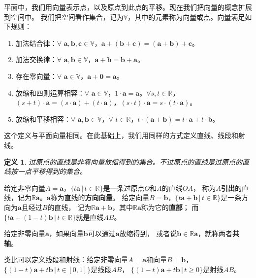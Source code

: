 \documentclass[12pt,UTF8]{ctexbook}
\newtheorem{df}{定义}[section]
\begin{document}
平面中，我们用向量表示点，以及原点到此点的平移。现在我们把向量的概念扩展到空间中。
我们把空间看作集合，记为$\mathbb{V}$，其中的元素称为向量或点。向量满足如下规则：

\begin{enumerate}
    \item 加法结合律：$\forall \,\, \mathbf{a}, \mathbf{b}, \mathbf{c} \in \mathbb{V}$，$\mathbf{a}+ (\mathbf{b} + \mathbf{c}) = (\mathbf{a} + \mathbf{b}) + \mathbf{c}$。
    \item 加法交换律：$\forall \,\, \mathbf{a}, \mathbf{b} \in \mathbb{V}$，$\mathbf{a} + \mathbf{b} = \mathbf{b} + \mathbf{a}$。
    \item 存在零向量：$\forall \,\, \mathbf{a} \in \mathbb{V}$，$\mathbf{a} + \mathbf{0} = \mathbf{a}$。
    \item 放缩和四则运算相容：$\forall \,\, \mathbf{a} \in \mathbb{V}$，$1\cdot \mathbf{a} = \mathbf{a}$。$\forall s, t \in \mathbb{R}$，$(s + t)\cdot\mathbf{a} = (s\cdot\mathbf{a}) + (t\cdot\mathbf{a})$，$(s \cdot t)\cdot \mathbf{a} = s \cdot (t\cdot \mathbf{a})$。
    \item 放缩和平移相容：$\forall \,\, \mathbf{a}, \mathbf{b} \in \mathbb{V}$，$\forall \,\, t \in \mathbb{R}$，$t\cdot(\mathbf{a} + \mathbf{b}) = t\cdot\mathbf{a} + t\cdot\mathbf{b}$。
\end{enumerate}

这个定义与平面向量相同。在此基础上，我们用同样的方式定义直线、线段和射线。
\begin{df}
    过原点的直线是非零向量放缩得到的集合。不过原点的直线是过原点的直线按一点平移得到的集合。
\end{df}
给定非零向量$A = \mathbf{a}$，$ \{t\mathbf{a} \, | \, t\in\mathbb{R}\}$是一条过原点$O$和$A$的直线$OA$，
称为$A$\textbf{引出}的直线，记为$\mathbb{R}\mathbf{a}$。$\mathbf{a}$称为直线的\textbf{方向向量}。
给定向量$B = \mathbf{b}$，$ \{t\mathbf{a}+\mathbf{b} \, | \, t\in\mathbb{R}\}$是一条方向为$\mathbf{a}$且经过$B$的直线，
记为$\mathbb{R}\mathbf{a}+\mathbf{b}$，其中$\mathbb{R}\mathbf{a}$称为它的\textbf{直部}；
而$ \{t\mathbf{a}+(1 - t)\mathbf{b} \, | \, t\in\mathbb{R}\}$就是直线$AB$。

给定非零向量$\mathbf{a}$，如果向量$\mathbf{b}$可以通过$\mathbf{a}$放缩得到，
或者说$\mathbf{b}\in \mathbb{R}\mathbf{a}$，就称两者\textbf{共轴}。

类比可以定义线段和射线：给定非零向量$A = \mathbf{a}$和向量$B =\mathbf{b}$，
$ \{(1 - t)\mathbf{a}+t\mathbf{b} \, | \, t\in [0, 1]\}$是线段$AB$，
$ \{(1 - t)\mathbf{a}+t\mathbf{b} \, | \, t \geqslant 0 \}$是射线$AB$。
\end{document}
